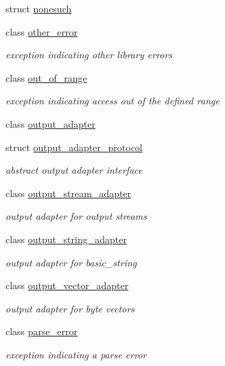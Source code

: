 \begin{DoxyCompactItemize}
\item 
struct \hyperlink{structnlohmann_1_1detail_1_1nonesuch}{nonesuch}
\item 
class \hyperlink{classnlohmann_1_1detail_1_1other__error}{other\+\_\+error}
\begin{DoxyCompactList}\small\item\em exception indicating other library errors \end{DoxyCompactList}\item 
class \hyperlink{classnlohmann_1_1detail_1_1out__of__range}{out\+\_\+of\+\_\+range}
\begin{DoxyCompactList}\small\item\em exception indicating access out of the defined range \end{DoxyCompactList}\item 
class \hyperlink{classnlohmann_1_1detail_1_1output__adapter}{output\+\_\+adapter}
\item 
struct \hyperlink{structnlohmann_1_1detail_1_1output__adapter__protocol}{output\+\_\+adapter\+\_\+protocol}
\begin{DoxyCompactList}\small\item\em abstract output adapter interface \end{DoxyCompactList}\item 
class \hyperlink{classnlohmann_1_1detail_1_1output__stream__adapter}{output\+\_\+stream\+\_\+adapter}
\begin{DoxyCompactList}\small\item\em output adapter for output streams \end{DoxyCompactList}\item 
class \hyperlink{classnlohmann_1_1detail_1_1output__string__adapter}{output\+\_\+string\+\_\+adapter}
\begin{DoxyCompactList}\small\item\em output adapter for basic\+\_\+string \end{DoxyCompactList}\item 
class \hyperlink{classnlohmann_1_1detail_1_1output__vector__adapter}{output\+\_\+vector\+\_\+adapter}
\begin{DoxyCompactList}\small\item\em output adapter for byte vectors \end{DoxyCompactList}\item 
class \hyperlink{classnlohmann_1_1detail_1_1parse__error}{parse\+\_\+error}
\begin{DoxyCompactList}\small\item\em exception indicating a parse error \end{DoxyCompactList}\item 

\end{DoxyCompactItemize}

